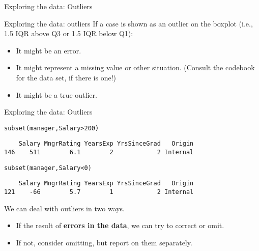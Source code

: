 \documentclass{beamer}\usepackage[]{graphicx}\usepackage[]{color}
\makeatletter
\newcommand{\hlnum}[1]{\textcolor[rgb]{0.824,0.412,0.118}{#1}}%
\newcommand{\hlopt}[1]{\textcolor[rgb]{1,0.894,0.769}{#1}}%
\newcommand{\hlstd}[1]{\textcolor[rgb]{1,0.894,0.769}{#1}}%
\newcommand{\hlkwd}[1]{\textcolor[rgb]{1,0.78,0.769}{#1}}%
\newenvironment{kframe}{%
 \def\at@end@of@kframe{}%
 \ifinner\ifhmode%
  \def\at@end@of@kframe{\end{minipage}}%
  \begin{minipage}{\columnwidth}%
 \fi\fi%
 \def\FrameCommand##1{\hskip\@totalleftmargin \hskip-\fboxsep
 \colorbox{shadecolor}{##1}\hskip-\fboxsep
     \hskip-\linewidth \hskip-\@totalleftmargin \hskip\columnwidth}%
 \MakeFramed {\advance\hsize-\width
   \@totalleftmargin\z@ \linewidth\hsize
   \@setminipage}}%
 {\par\unskip\endMakeFramed%
 \at@end@of@kframe}
\newenvironment{knitrout}{}{} %
\makeatother
\begin{document}
\begin{darkframes}
\begin{frame}[fragile]{Exploring the data: Outliers}
\begin{knitrout}
\end{knitrout}
    \end{frame}

    \begin{frame}{Exploring the data: outliers}
      If a case is shown as an outlier on the boxplot (i.e., 1.5 IQR above Q3 or 1.5 IQR below Q1):
      \begin{itemize}
        \item It might be an error.
        \item It might represent a missing value or other situation. (Consult the codebook for the data set, if there is one!)
        \item It might be a true outlier.
      \end{itemize}
    \end{frame}

    \begin{frame}[fragile]{Exploring the data: Outliers}
\begin{knitrout}
\color{fgcolor}\begin{kframe}
\begin{alltt}
\hlkwd{subset}\hlstd{(manager, Salary} \hlopt{>} \hlnum{200}\hlstd{)}
\end{alltt}
\begin{verbatim}
    Salary MngrRating YearsExp YrsSinceGrad   Origin
146    511        6.1        2            2 Internal
\end{verbatim}
\begin{alltt}
\hlkwd{subset}\hlstd{(manager, Salary} \hlopt{<} \hlnum{0}\hlstd{)}
\end{alltt}
\begin{verbatim}
    Salary MngrRating YearsExp YrsSinceGrad   Origin
121    -66        5.7        1            2 Internal
\end{verbatim}
\end{kframe}
\end{knitrout}
      \pause

      We can deal with outliers in two ways.
      \begin{itemize}[<+->]
        \item If the result of \textbf{errors in the data}, we can try to correct or omit.
        \item If not, consider omitting, but report on them separately.
      \end{itemize}
    \end{frame}


\end{darkframes}
\end{document}
